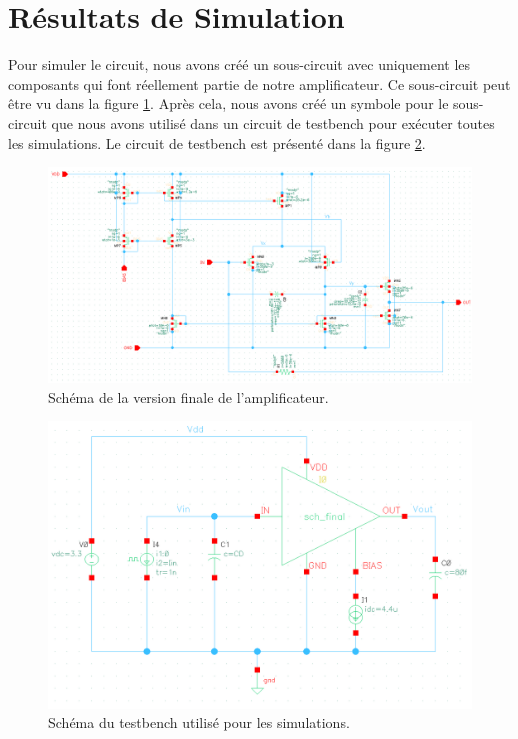 \documentclass[a4paper,12pt]{article}
\numberwithin{equation}{section}
\newcommand{\?}{\stackrel{?}{=}}
\begin{document}
\FloatBarrier
\newpage
\section{Résultats de Simulation}\label{sec:simulations}

Pour simuler le circuit, nous avons créé un sous-circuit avec uniquement les composants qui font réellement partie de notre amplificateur. Ce sous-circuit peut être vu dans la figure \ref{fig:csh_final}. Après cela, nous avons créé un symbole pour le sous-circuit que nous avons utilisé dans un circuit de testbench pour exécuter toutes les simulations. Le circuit de testbench est présenté dans la figure \ref{fig:sch_bench}.

\begin{figure}[htp!]
    \centering
    \includegraphics[width=\linewidth]{images/csh_final.png}
    \caption{Schéma de la version finale de l'amplificateur.}
    \label{fig:csh_final}
\end{figure}

\begin{figure}[htp!]
    \centering
    \includegraphics[width=0.7\linewidth]{images/sch_bench.png}
    \caption{Schéma du testbench utilisé pour les simulations.}
    \label{fig:sch_bench}
\end{figure}
\end{document}
